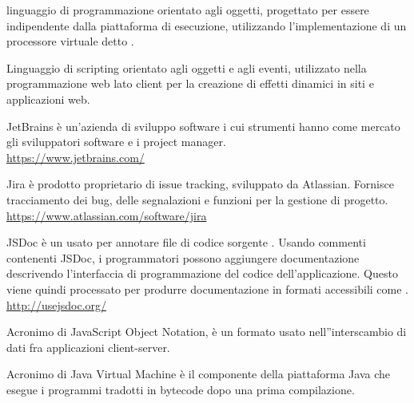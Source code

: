 linguaggio di programmazione orientato agli oggetti, progettato per essere indipendente dalla piattaforma di esecuzione, utilizzando l'implementazione di un processore virtuale detto .

Linguaggio di scripting orientato agli oggetti e agli eventi, utilizzato nella programmazione web lato client per la creazione di effetti dinamici in siti e applicazioni web.

JetBrains è un'azienda di sviluppo software i cui strumenti hanno come mercato gli sviluppatori software e i project manager.\\
\url{https://www.jetbrains.com/}

Jira è prodotto proprietario di issue tracking, sviluppato da Atlassian. Fornisce tracciamento dei bug, delle segnalazioni e funzioni per la gestione di progetto.\\
\url{https://www.atlassian.com/software/jira}

JSDoc è un  usato per annotare file di codice sorgente . Usando commenti contenenti JSDoc, i programmatori possono aggiungere documentazione descrivendo l’interfaccia di programmazione del codice dell’applicazione. Questo viene quindi processato per produrre documentazione in formati accessibili come .\\
\url{http://usejsdoc.org/}

Acronimo di JavaScript Object Notation, \`e un formato usato nell''interscambio di dati fra applicazioni client-server.

Acronimo di Java Virtual Machine \`e il componente della piattaforma Java che esegue i programmi tradotti in bytecode dopo una prima compilazione.
\clearpage